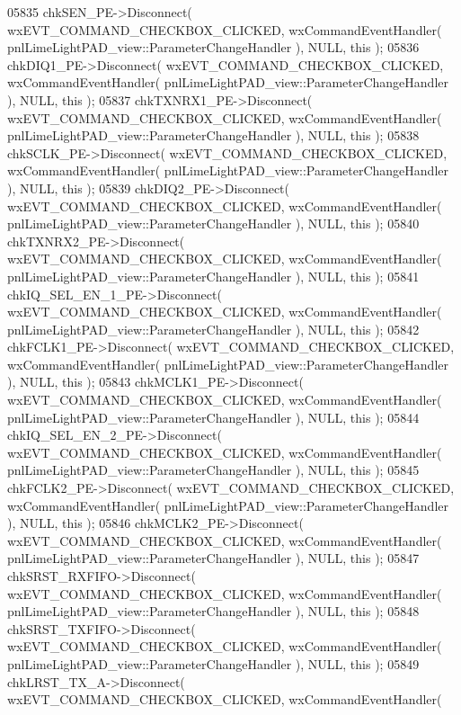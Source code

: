 \begin{DoxyCode}
05835     chkSEN_PE->Disconnect( wxEVT\_COMMAND\_CHECKBOX\_CLICKED, wxCommandEventHandler( 
      pnlLimeLightPAD_view::ParameterChangeHandler ), NULL, \textcolor{keyword}{this} );
05836     chkDIQ1_PE->Disconnect( wxEVT\_COMMAND\_CHECKBOX\_CLICKED, wxCommandEventHandler( 
      pnlLimeLightPAD_view::ParameterChangeHandler ), NULL, \textcolor{keyword}{this} );
05837     chkTXNRX1_PE->Disconnect( wxEVT\_COMMAND\_CHECKBOX\_CLICKED, wxCommandEventHandler( 
      pnlLimeLightPAD_view::ParameterChangeHandler ), NULL, \textcolor{keyword}{this} );
05838     chkSCLK_PE->Disconnect( wxEVT\_COMMAND\_CHECKBOX\_CLICKED, wxCommandEventHandler( 
      pnlLimeLightPAD_view::ParameterChangeHandler ), NULL, \textcolor{keyword}{this} );
05839     chkDIQ2_PE->Disconnect( wxEVT\_COMMAND\_CHECKBOX\_CLICKED, wxCommandEventHandler( 
      pnlLimeLightPAD_view::ParameterChangeHandler ), NULL, \textcolor{keyword}{this} );
05840     chkTXNRX2_PE->Disconnect( wxEVT\_COMMAND\_CHECKBOX\_CLICKED, wxCommandEventHandler( 
      pnlLimeLightPAD_view::ParameterChangeHandler ), NULL, \textcolor{keyword}{this} );
05841     chkIQ_SEL_EN_1_PE->Disconnect( wxEVT\_COMMAND\_CHECKBOX\_CLICKED, wxCommandEventHandler( 
      pnlLimeLightPAD_view::ParameterChangeHandler ), NULL, \textcolor{keyword}{this} );
05842     chkFCLK1_PE->Disconnect( wxEVT\_COMMAND\_CHECKBOX\_CLICKED, wxCommandEventHandler( 
      pnlLimeLightPAD_view::ParameterChangeHandler ), NULL, \textcolor{keyword}{this} );
05843     chkMCLK1_PE->Disconnect( wxEVT\_COMMAND\_CHECKBOX\_CLICKED, wxCommandEventHandler( 
      pnlLimeLightPAD_view::ParameterChangeHandler ), NULL, \textcolor{keyword}{this} );
05844     chkIQ_SEL_EN_2_PE->Disconnect( wxEVT\_COMMAND\_CHECKBOX\_CLICKED, wxCommandEventHandler( 
      pnlLimeLightPAD_view::ParameterChangeHandler ), NULL, \textcolor{keyword}{this} );
05845     chkFCLK2_PE->Disconnect( wxEVT\_COMMAND\_CHECKBOX\_CLICKED, wxCommandEventHandler( 
      pnlLimeLightPAD_view::ParameterChangeHandler ), NULL, \textcolor{keyword}{this} );
05846     chkMCLK2_PE->Disconnect( wxEVT\_COMMAND\_CHECKBOX\_CLICKED, wxCommandEventHandler( 
      pnlLimeLightPAD_view::ParameterChangeHandler ), NULL, \textcolor{keyword}{this} );
05847     chkSRST_RXFIFO->Disconnect( wxEVT\_COMMAND\_CHECKBOX\_CLICKED, wxCommandEventHandler( 
      pnlLimeLightPAD_view::ParameterChangeHandler ), NULL, \textcolor{keyword}{this} );
05848     chkSRST_TXFIFO->Disconnect( wxEVT\_COMMAND\_CHECKBOX\_CLICKED, wxCommandEventHandler( 
      pnlLimeLightPAD_view::ParameterChangeHandler ), NULL, \textcolor{keyword}{this} );
05849     chkLRST_TX_A->Disconnect( wxEVT\_COMMAND\_CHECKBOX\_CLICKED, wxCommandEventHandler( 

\end{DoxyCode}
